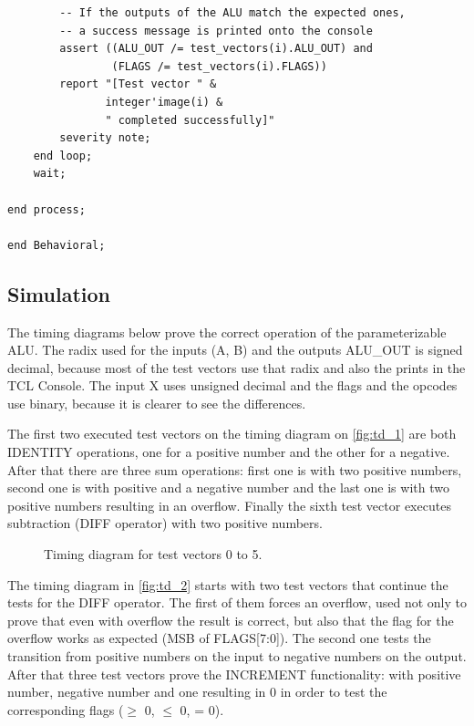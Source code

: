 \documentclass[10pt]{article}
\begin{document}
\begin{verbatim}
        -- If the outputs of the ALU match the expected ones,
        -- a success message is printed onto the console
        assert ((ALU_OUT /= test_vectors(i).ALU_OUT) and 
                (FLAGS /= test_vectors(i).FLAGS))
        report "[Test vector " &
               integer'image(i) &
               " completed successfully]"
        severity note;
    end loop;
    wait;

end process;

end Behavioral;

\end{verbatim}
\newpage
\subsection{Simulation}
The timing diagrams below prove the correct operation of the parameterizable ALU.
The radix used for the inputs (A, B) and the outputs ALU\_OUT is signed decimal, because most of the test vectors use that radix and also the prints in the TCL Console.
The input X uses unsigned decimal and the flags and the opcodes use binary, because it is clearer to see the differences.

The first two executed test vectors on the timing diagram on \autoref{fig:td_1} are both IDENTITY operations, one for a positive number and the other for a negative.
After that there are three sum operations: first one is with two positive numbers, second one is with positive and a negative number and the last one is with two positive numbers resulting in an overflow.
Finally the sixth test vector executes subtraction (DIFF operator) with two positive numbers.
\begin{figure}[ht]
    \centering
    \caption{Timing diagram for test vectors 0 to 5.}
    \label{fig:td_1}
\end{figure}

The timing diagram in \autoref{fig:td_2} starts with two test vectors that continue the tests for the DIFF operator. The first of them forces an overflow, used not only to prove that even with overflow the result is correct, but also that the flag for the overflow works as expected (MSB of FLAGS[7:0]). The second one tests the transition from positive numbers on the input to negative numbers on the output.
After that three test vectors prove the INCREMENT functionality: with positive number, negative number and one resulting in 0 in order to test the corresponding flags ($\geq$ 0,  $\leq$ 0, = 0).
\end{document}
